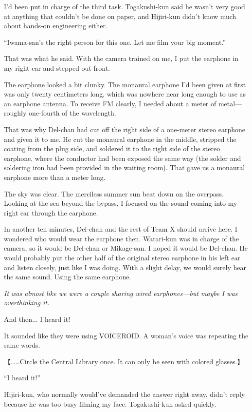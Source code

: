 \documentclass[
    a4paper,
    12pt,
    twoside,
    openany,
    UTF8,
    fontset=windows
]{ctexbook}
\begin{document}
I'd been put in charge of the third task. Togakushi-kun said he wasn't very good at anything that couldn't be done on paper, and Hijiri-kun didn't know much about hands-on engineering either.

``Iwama-san's the right person for this one. Let me film your big moment.''

That was what he said. With the camera trained on me, I put the earphone in my right ear and stepped out front.

The earphone looked a bit clunky. The monaural earphone I'd been given at first was only twenty centimeters long, which was nowhere near long enough to use as an earphone antenna. To receive FM clearly, I needed about a meter of metal---roughly one-fourth of the wavelength.

That was why Del-chan had cut off the right side of a one-meter stereo earphone and given it to me. He cut the monaural earphone in the middle, stripped the coating from the plug side, and soldered it to the right side of the stereo earphone, where the conductor had been exposed the same way (the solder and soldering iron had been provided in the waiting room). That gave us a monaural earphone more than a meter long.

The sky was clear. The merciless summer sun beat down on the overpass. Looking at the sea beyond the bypass, I focused on the sound coming into my right ear through the earphone.

In another ten minutes, Del-chan and the rest of Team X should arrive here. I wondered who would wear the earphone then. Watari-kun was in charge of the camera, so it would be Del-chan or Mikage-san. I hoped it would be Del-chan. He would probably put the other half of the original stereo earphone in his left ear and listen closely, just like I was doing. With a slight delay, we would surely hear the same sound. Using the same earphone.

\textit{It was almost like we were a couple sharing wired earphones---but maybe I was overthinking it.}

And then... I heard it!

It sounded like they were using VOICEROID. A woman's voice was repeating the same words.

【\dots\dots Circle the Central Library once. It can only be seen with colored glasses.】

``I heard it!''

Hijiri-kun, who normally would've demanded the answer right away, didn't reply because he was too busy filming my face. Togakushi-kun asked quickly.
\end{document}
